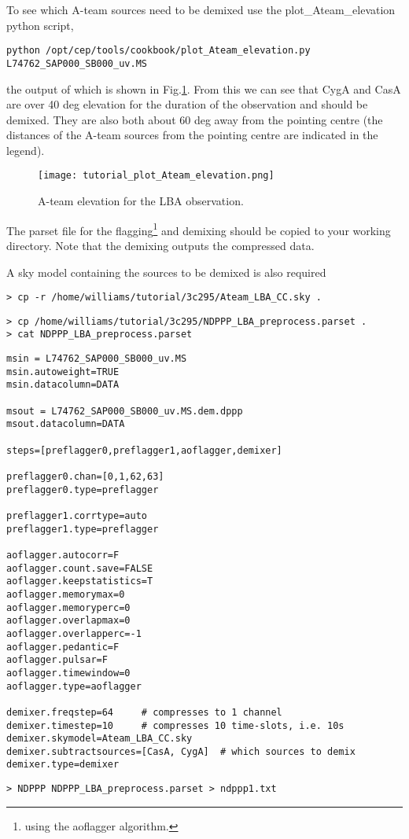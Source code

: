 To see which A-team sources need to be demixed use the plot\_Ateam\_elevation python script,
\begin{verbatim}
python /opt/cep/tools/cookbook/plot_Ateam_elevation.py L74762_SAP000_SB000_uv.MS
\end{verbatim}
the output of which is shown in Fig.\ref{fig:Ateam}. 
From this we can see that CygA and CasA are over 40 deg elevation for the
duration of the observation and should be demixed. They are also both about 60
deg away from the pointing centre (the distances of the A-team sources from the
pointing centre are indicated in the legend).

\begin{figure}[htp]
 \centering
\texttt{[image: tutorial\_plot\_Ateam\_elevation.png]}
\caption{A-team elevation for the LBA observation.}
\label{fig:Ateam}
\end{figure}

The parset file for the flagging\footnote{using the aoflagger algorithm.} and demixing should be copied to your working directory. Note that the demixing outputs the compressed data.

A sky model containing the sources to be demixed is also required
\begin{verbatim}
> cp -r /home/williams/tutorial/3c295/Ateam_LBA_CC.sky .
\end{verbatim}


\begin{verbatim}
> cp /home/williams/tutorial/3c295/NDPPP_LBA_preprocess.parset .
> cat NDPPP_LBA_preprocess.parset
\end{verbatim}
\begin{lstlisting}
msin = L74762_SAP000_SB000_uv.MS
msin.autoweight=TRUE
msin.datacolumn=DATA

msout = L74762_SAP000_SB000_uv.MS.dem.dppp
msout.datacolumn=DATA

steps=[preflagger0,preflagger1,aoflagger,demixer]

preflagger0.chan=[0,1,62,63]
preflagger0.type=preflagger

preflagger1.corrtype=auto
preflagger1.type=preflagger

aoflagger.autocorr=F
aoflagger.count.save=FALSE
aoflagger.keepstatistics=T
aoflagger.memorymax=0
aoflagger.memoryperc=0
aoflagger.overlapmax=0
aoflagger.overlapperc=-1
aoflagger.pedantic=F
aoflagger.pulsar=F
aoflagger.timewindow=0
aoflagger.type=aoflagger

demixer.freqstep=64     # compresses to 1 channel
demixer.timestep=10     # compresses 10 time-slots, i.e. 10s
demixer.skymodel=Ateam_LBA_CC.sky
demixer.subtractsources=[CasA, CygA]  # which sources to demix
demixer.type=demixer
\end{lstlisting}
\begin{verbatim}
> NDPPP NDPPP_LBA_preprocess.parset > ndppp1.txt
\end{verbatim}


